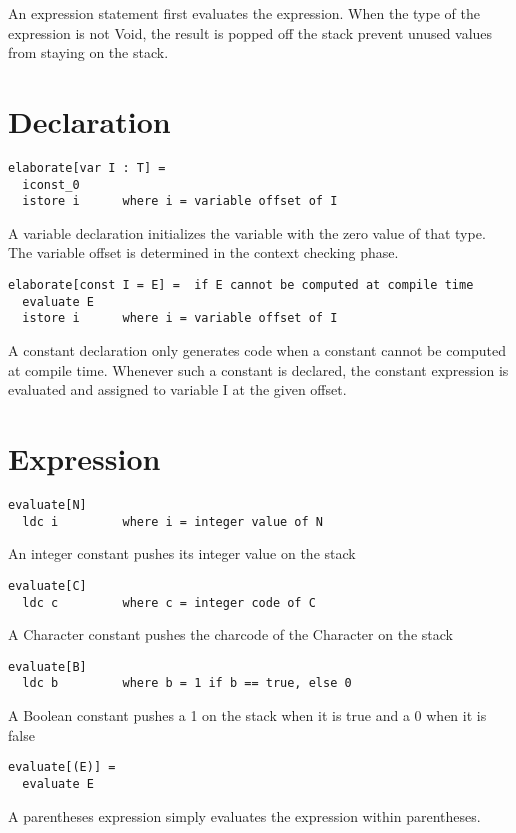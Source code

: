 An expression statement first evaluates the expression. When the type of the expression is not Void, the result is popped off the stack prevent unused values from staying on the stack.
  
\section{Declaration}
\begin{lstlisting}
elaborate[var I : T] = 	
  iconst_0
  istore i		where i = variable offset of I
\end{lstlisting}

A variable declaration initializes the variable with the zero value of that type. The variable offset is determined in the context checking phase.

\begin{lstlisting}
elaborate[const I = E] =  if E cannot be computed at compile time
  evaluate E		
  istore i		where i = variable offset of I
\end{lstlisting}

A constant declaration only generates code when a constant cannot be computed at compile time. Whenever such a constant is declared, the constant expression is evaluated and assigned to variable I at the given offset.

\section{Expression}
\begin{lstlisting}
evaluate[N]
  ldc i			where i = integer value of N
\end{lstlisting}
An integer constant pushes its integer value on the stack

\begin{lstlisting}  
evaluate[C]
  ldc c			where c = integer code of C
\end{lstlisting}
A Character constant pushes the charcode of the Character on the stack

\begin{lstlisting}  
evaluate[B]
  ldc b			where b = 1 if b == true, else 0
\end{lstlisting}
A Boolean constant pushes a 1 on the stack when it is true and a 0 when it is false
  
\begin{lstlisting}
evaluate[(E)] =
  evaluate E
\end{lstlisting}
A parentheses expression simply evaluates the expression within parentheses.
  
